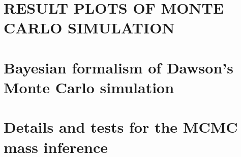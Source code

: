 \documentclass[letterpaper,useAMS,usenatbib]{"mn2e"}
\begin{document}



\section{RESULT PLOTS OF MONTE CARLO SIMULATION} 
\label{app: plots}


\appendix
\section{Bayesian formalism of Dawson's Monte Carlo simulation}


\section{Details and tests for the MCMC mass inference}\label{app:MCMC}


\bsp 
\label{lastpage} 
\end{document}
